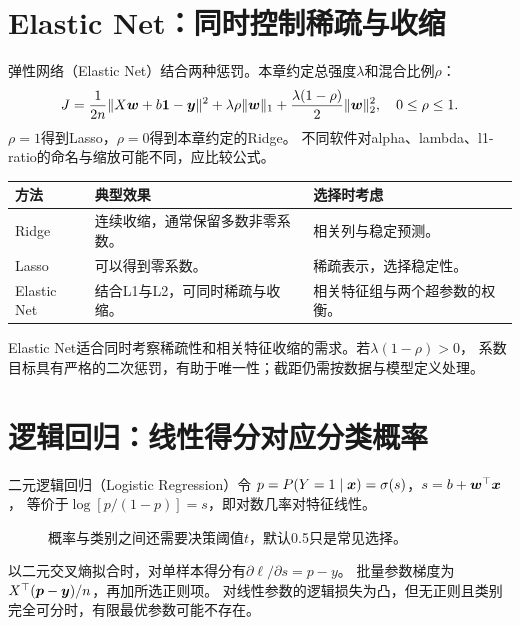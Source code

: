 \section{Elastic Net：同时控制稀疏与收缩}
\label{sec:linear-elastic}
弹性网络（Elastic Net）结合两种惩罚。本章约定总强度$\lambda$和混合比例$\rho$：
\[
 J=\frac1{2n}\lVert X\boldsymbol{w}+b\boldsymbol{1}-\boldsymbol{y}\rVert^2
 +\lambda\rho\lVert\boldsymbol{w}\rVert_1
 +\frac{\lambda(1-\rho)}2\lVert\boldsymbol{w}\rVert_2^2,
 \quad0\leq\rho\leq1.
\]
$\rho=1$得到Lasso，$\rho=0$得到本章约定的Ridge。
不同软件对alpha、lambda、l1-ratio的命名与缩放可能不同，应比较公式。

\begin{center}
\begin{tabularx}{\textwidth}{P{26mm}P{45mm}Y}
\toprule
方法 & 典型效果 & 选择时考虑\\
\midrule
Ridge & 连续收缩，通常保留多数非零系数。 & 相关列与稳定预测。\\
Lasso & 可以得到零系数。 & 稀疏表示，选择稳定性。\\
Elastic Net & 结合L1与L2，可同时稀疏与收缩。 & 相关特征组与两个超参数的权衡。\\
\bottomrule
\end{tabularx}
\end{center}

Elastic Net适合同时考察稀疏性和相关特征收缩的需求。若$\lambda(1-\rho)>0$，
系数目标具有严格的二次惩罚，有助于唯一性；截距仍需按数据与模型定义处理。




\section{逻辑回归：线性得分对应分类概率}
\label{sec:linear-logistic}
二元逻辑回归（Logistic Regression）令
$p=P(Y=1\mid\boldsymbol{x})=\sigma(s)$，$s=b+\boldsymbol{w}^\top\boldsymbol{x}$，
等价于$\log[p/(1-p)]=s$，即对数几率对特征线性。

\begin{figure}[htbp]
\centering
\caption{概率与类别之间还需要决策阈值$t$，默认0.5只是常见选择。}
\par\smallskip
{}
\end{figure}

以二元交叉熵拟合时，对单样本得分有$\partial\ell/\partial s=p-y$。
批量参数梯度为$X^\top(\boldsymbol{p}-\boldsymbol{y})/n$，再加所选正则项。
对线性参数的逻辑损失为凸，但无正则且类别完全可分时，有限最优参数可能不存在。

